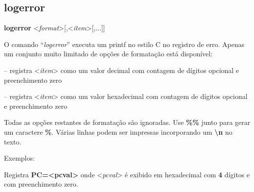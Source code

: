 \documentclass[letterpaper,10pt,brazil]{sphinxmanual}
\begin{document}
\subsection{logerror}
\label{debugger/general:logerror}\label{debugger/general:debugger-command-logerror}
\begin{DUlineblock}{0em}
\item[]
\begin{DUlineblock}{\DUlineblockindent}
\item[] \textbf{logerror} \textless{}\emph{format}\textgreater{}{[},\textless{}\emph{item}\textgreater{}{[},...{]}{]}
\item[] 
\end{DUlineblock}
\item[] O comando ``\emph{logerror}'' executa um printf no estilo C no registro de erro. Apenas um conjunto muito limitado de opções de formatação está disponível:
\item[] 
\item[]
\begin{DUlineblock}{\DUlineblockindent}
\item[]  -- registra \textless{}\emph{item}\textgreater{} como um valor decimal com contagem de dígitos opcional e preenchimento zero
\item[]  -- registra \textless{}\emph{item}\textgreater{} como um valor hexadecimal com contagem de dígitos opcional e preenchimento zero
\item[] 
\end{DUlineblock}
\item[] Todas as opções restantes de formatação são ignoradas. Use \textbf{\%\%} junto para gerar um caractere \textbf{\%}. Várias linhas podem ser impressas incorporando um \textbf{\textbackslash{}n} no texto.
\item[] 
\item[] Exemplos:
\item[] 
\item[]
\begin{DUlineblock}{\DUlineblockindent}
\item[] 
\item[] 
\end{DUlineblock}
\item[] Registra \textbf{PC=\textless{}pcval\textgreater{}} onde \textless{}\emph{pcval}\textgreater{} é exibido em hexadecimal com \textbf{4} dígitos e com preenchimento zero.

\end{DUlineblock}
\end{document}
